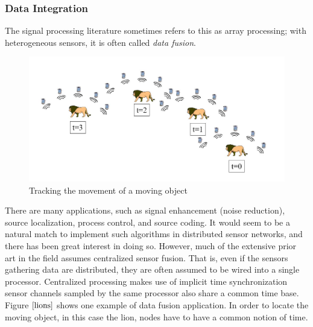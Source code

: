 \documentclass[a4paper,10pt]{report}
\begin{document}
\subsubsection{Data Integration}
The signal processing literature sometimes refers to this as array processing;
with heterogeneous sensors, it is often called \textit{data fusion}.
\begin{figure}
\centering
\includegraphics[width= 0.75 \textwidth]{lions}
\caption{Tracking the movement of a moving object}
\label{lions}
\end{figure}
\newline
There are many applications, such as signal enhancement (noise
reduction), source localization, process control, and source coding.
It would seem to be a natural match to implement such algorithms in
distributed sensor networks, and there has been great interest in
doing so. However, much of the extensive prior art in the field
assumes centralized sensor fusion. That is, even if the sensors
gathering data are distributed, they are often assumed to be wired
into a single processor. Centralized processing makes use of
implicit time synchronization sensor channels sampled by the same
processor also share a common time base. Figure $\ref{lions}$ shows
one example of data fusion application. In order to locate the
moving object, in this case the lion, nodes have to have a common
notion of time.
\end{document}
